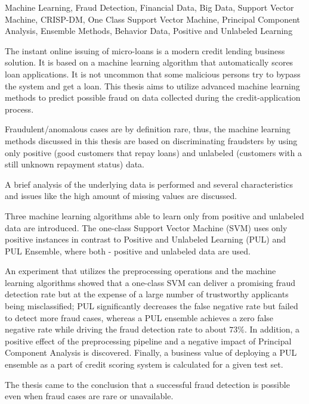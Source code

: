 \documentclass[draft=false
              ,paper=a4
              ,twoside=false
              ,fontsize=11pt
              ,headsepline
              ,BCOR10mm
              ,DIV11
              ]{scrbook}
\begin{document}
{
    Machine Learning, 
    Fraud Detection, 
    Financial Data, 
    Big Data, 
    Support Vector Machine, 
    CRISP-DM, 
    One Class Support Vector Machine, 
    Principal Component Analysis, 
    Ensemble Methods, Behavior Data, 
    Positive and Unlabeled Learning
    
}
{ 
      The instant online issuing of micro-loans is a modern credit lending business solution. It is based on a machine learning algorithm that automatically scores loan applications.
      It is not uncommon that some malicious persons try to bypass the system and get a loan. 
      This thesis aims to utilize advanced machine learning methods to predict possible fraud on data collected during the credit-application process. 

      Fraudulent/anomalous cases are by definition rare, thus, the machine learning methods discussed in this thesis are based on discriminating fraudsters by using only positive (good customers that repay loans) and unlabeled (customers with a still unknown repayment status) data. 

      A brief analysis of the underlying data is performed and several characteristics and issues like the high amount of missing values are discussed.

      Three machine learning algorithms able to learn only from positive and unlabeled data are introduced. The one-class Support Vector Machine (SVM) uses only positive instances in contrast to Positive and Unlabeled Learning (PUL) and PUL Ensemble, where both - positive and unlabeled data are used. 

      An experiment that utilizes the preprocessing operations and the machine learning algorithms showed that a one-class SVM can deliver a promising fraud detection rate but at the expense of a large number of trustworthy applicants being misclassified; PUL significantly decreases the false negative rate but failed to detect more fraud cases, whereas a PUL ensemble achieves a zero false negative rate while driving the fraud detection rate to about \(73\%\). In addition, a positive effect of the preprocessing pipeline and a negative impact of Principal Component Analysis is discovered. Finally, a business value of deploying a PUL ensemble as a part of credit scoring system is calculated for a given test set.

      The thesis came to the conclusion that a successful fraud detection is possible even when fraud cases are rare or unavailable.
}

\newpage
\singlespacing
\end{document}
